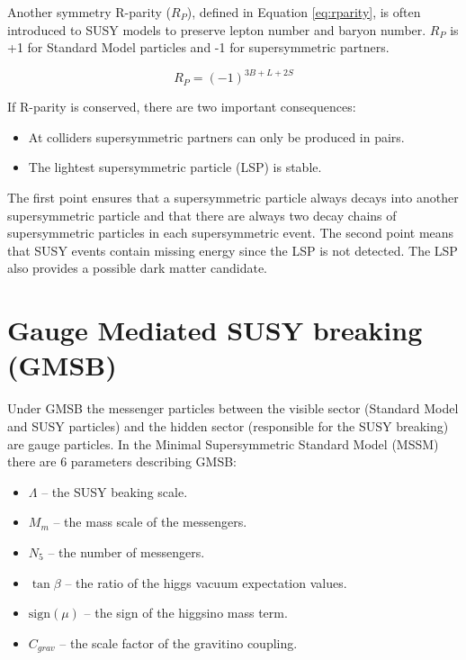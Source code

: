 Another symmetry R-parity ($R_{P}$), defined in Equation \ref{eq:rparity}, is 
often introduced to SUSY models to preserve lepton number and baryon number. 
$R_{P}$ is +1 for Standard Model particles and -1 for supersymmetric partners.

\begin{equation}
R_{P} = (-1)^{3B+L+2S}
\label{eq:rparity}
\end{equation}

If R-parity is conserved, there are two important consequences:

\begin{itemize}
\item At colliders supersymmetric partners can only be produced in pairs.
\item The lightest supersymmetric particle (LSP) is stable.
\end{itemize}

The first point ensures that a supersymmetric particle always decays into 
another supersymmetric particle and that there are always two decay chains of 
supersymmetric particles in each supersymmetric event. The second point means 
that SUSY events contain missing energy since the LSP is not detected. The LSP 
also provides a possible dark matter candidate.

\section{Gauge Mediated SUSY breaking (GMSB)}

Under GMSB the messenger particles between the visible sector (Standard Model
and SUSY particles) and the hidden sector (responsible for the SUSY breaking)
are gauge particles. In the Minimal Supersymmetric Standard Model (MSSM) there 
are 6 parameters describing GMSB:

\begin{itemize}
\item $\Lambda$ -- the SUSY beaking scale. 
\item $M_{m}$ -- the mass scale of the messengers.
\item $N_{5}$ -- the number of messengers.
\item $\tan\beta$ -- the ratio of the higgs vacuum expectation values.
\item $\mbox{sign}(\mu)$ -- the sign of the higgsino mass term.
\item $C_{grav}$ -- the scale factor of the gravitino coupling.
\end{itemize}

